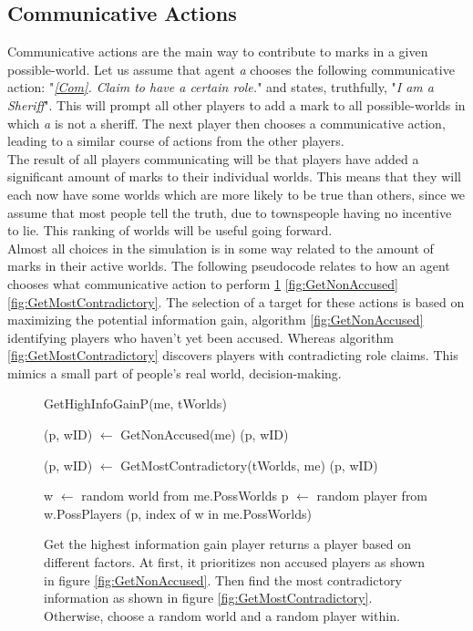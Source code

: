 \subsection{Communicative Actions}\label{CommunicativeActions}
Communicative actions are the main way to contribute to marks in a given
possible-world. Let us assume that agent \textit{a} chooses the following
communicative action: "\textit{\ref{Com}. Claim to have a certain role.}" and
states, truthfully, "\textit{I am a Sheriff}". This will prompt all other
players to add a mark to all possible-worlds in which \textit{a} is not a
sheriff. The next player then chooses a communicative action, leading to a
similar course of actions from the other players. \\ The result of all players
communicating will be that players have added a significant amount of marks to
their individual worlds. This means that they will each now have some worlds
which are more likely to be true than others, since we assume that most people
tell the truth, due to townspeople having no incentive to lie. This ranking of
worlds will be useful going forward.\\ Almost all choices in the simulation is
in some way related to the amount of marks in their active worlds. The
following pseudocode relates to how an agent chooses what communicative action
to perform \ref{fig:GetHighInfoGainP} \ref{fig:GetNonAccused}
\ref{fig:GetMostContradictory}. The selection of a target for these actions is
based on maximizing the potential information gain, algorithm
\ref{fig:GetNonAccused} identifying players who haven't yet been accused.
Whereas algorithm \ref{fig:GetMostContradictory} discovers players with
contradicting role claims. This mimics a small part of people's real world,
decision-making.\\
\begin{figure}[H]
	\begin{algorithm}[H]
		\caption{GetHighInfoGainP(me, tWorlds)}
		\begin{algorithmic}
			\State (p, wID) $\gets$ GetNonAccused(me)
			\State \Return (p, wID)
			\EndIf
			\EndIf

			\State (p, wID) $\gets$ GetMostContradictory(tWorlds, me)
			\State \Return (p, wID)
			\EndIf

			\State w $\gets$ random world from me.PossWorlds
			\State p $\gets$ random player from w.PossPlayers
			\State \Return (p, index of w in me.PossWorlds)
		\end{algorithmic}
	\end{algorithm}
	\caption{Get the highest information gain player returns a player based on different factors.
		At first, it prioritizes non accused players as shown in figure \ref{fig:GetNonAccused}.
		Then find the most contradictory information as shown in figure \ref{fig:GetMostContradictory}.
		Otherwise, choose a random world and a random player within.
	}
	\label{fig:GetHighInfoGainP}
\end{figure}
